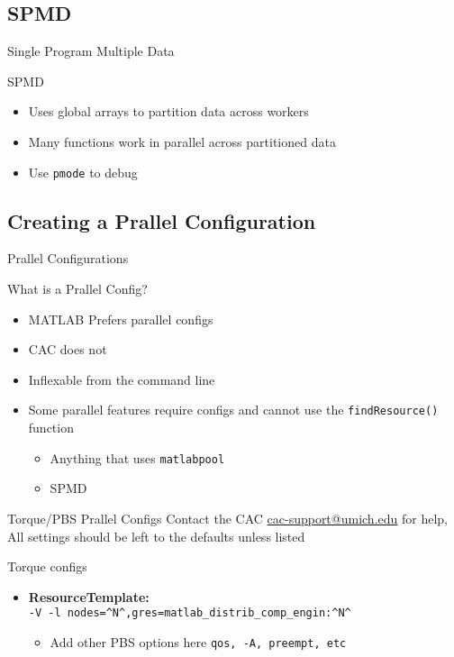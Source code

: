 \documentclass[handout]{beamer}
\begin{document}
   \subsection{SPMD}
\begin{frame}{Single Program Multiple Data}
 \begin{block}{SPMD}
  \begin{itemize}
    \item Uses global arrays to partition data across workers
    \item Many functions work in parallel across partitioned data
    \item Use \texttt{pmode} to debug
  \end{itemize}
 \end{block}
\end{frame}

   \subsection{Creating a Prallel Configuration}
\begin{frame}{Prallel Configurations}
\begin{block}{What is a Prallel Config?}
 \begin{itemize}
  \item MATLAB Prefers parallel configs
  \item CAC does not
  \item Inflexable from the command line
  \item Some parallel features require configs and cannot use the \texttt{findResource()} function
  \begin{itemize}
   \item Anything that uses \texttt{matlabpool}
   \item SPMD
  \end{itemize}
 \end{itemize}
\end{block}
\end{frame}

\begin{frame}{Torque/PBS Prallel Configs}
 Contact the CAC \url{cac-support@umich.edu} for help, All settings should be left to the defaults unless listed
 \begin{block}{Torque configs}
  \begin{itemize}
   \item {\bf ResourceTemplate:}\\ \texttt{-V -l nodes=\^{}N\^{},gres=matlab\_distrib\_comp\_engin:\^{}N\^{}}
    \begin{itemize}
     \item {Add other PBS options here \texttt{qos, -A, preempt, etc}}
    \end{itemize}
  \end{itemize}
 \end{block}
\end{frame}
\end{document}
